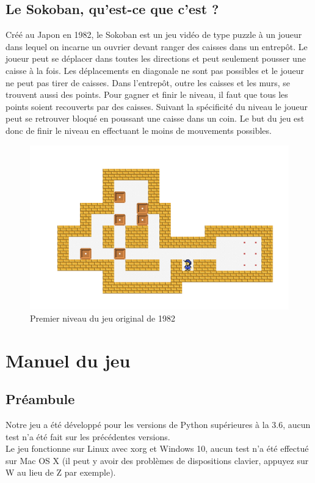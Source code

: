 \documentclass[a4paper,12pt]{article}
\begin{document}
\subsection{Le Sokoban, qu’est-ce que c’est ?}

Créé au Japon en 1982, le Sokoban est un jeu vidéo  de type puzzle à un joueur dans lequel on incarne un ouvrier devant ranger des caisses dans un entrepôt. Le joueur peut se déplacer dans toutes les directions et peut seulement pousser une caisse à la fois. Les déplacements en diagonale ne sont pas possibles et le joueur ne peut pas tirer de caisses. Dans l’entrepôt, outre les caisses et les murs, se trouvent aussi des points. Pour gagner et finir le niveau, il faut que tous les points soient recouverts par des caisses. Suivant la spécificité du niveau le joueur peut se retrouver bloqué en poussant une caisse dans un coin. Le but du jeu est donc de finir le niveau en effectuant le moins de mouvements possibles.
\begin{figure}[H]
    \includegraphics{./Illustrations/Original.png}
    \caption{Premier niveau du jeu original de 1982}
\end{figure}
\newpage
\section{Manuel du jeu}

\subsection{Préambule}

Notre jeu a été développé pour les versions de Python supérieures à la 3.6, aucun test n'a été fait sur les précédentes versions.\\
Le jeu fonctionne sur  Linux avec xorg et Windows 10, aucun test n'a été effectué sur Mac OS X (il peut y avoir des problèmes de dispositions clavier, appuyez sur W au lieu de Z par exemple).\\
\end{document}
